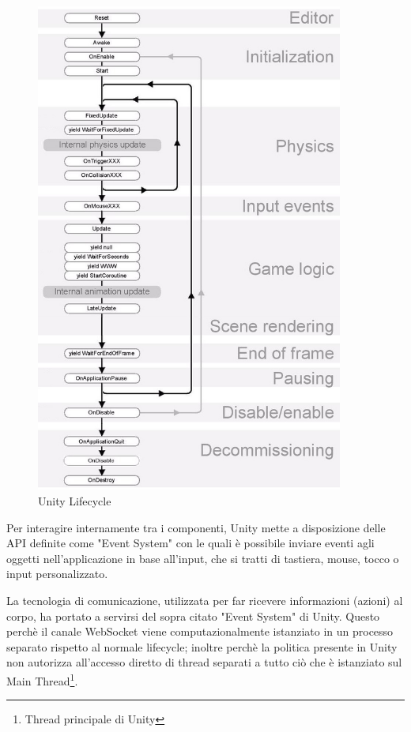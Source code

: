 \begin{figure}[H]
\centering
\includegraphics[width=0.9\textwidth]{figures/Unity_lifecycle.jpeg}
\caption{Unity Lifecycle}
\label{unity_lifecycle}
\end{figure}

Per interagire internamente tra i componenti, Unity mette a disposizione delle API definite come "Event System"\cite{unity_event_system} con le quali è possibile inviare eventi agli oggetti nell'applicazione in base all'input, che si tratti di tastiera, mouse, tocco o input personalizzato.

\medskip

La tecnologia di comunicazione, utilizzata per far ricevere informazioni (azioni) al corpo, ha portato a servirsi del sopra citato "Event System" di Unity. Questo perchè il canale WebSocket viene computazionalmente istanziato in un processo separato rispetto al normale lifecycle; inoltre perchè la politica presente in Unity non autorizza all'accesso diretto di thread separati a tutto ciò che è istanziato sul Main Thread\footnote{Thread principale di Unity}.

